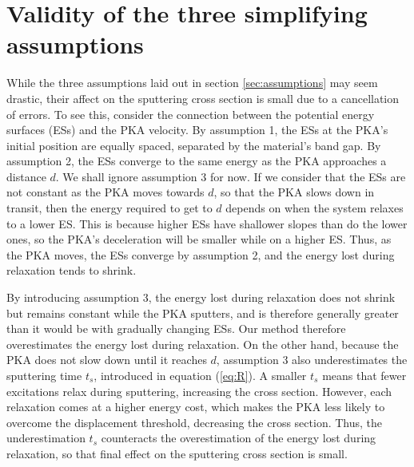 \documentclass{article}
\begin{document}
\pagebreak
\section{Validity of the three simplifying assumptions}
\label{app:assumptions}

While the three assumptions laid out in section \ref{sec:assumptions} may seem
drastic, their affect on the sputtering cross section is small due to a
cancellation of errors.
To see this, consider the connection between the potential energy
surfaces (ESs) and the PKA velocity.
By assumption 1, the ESs at the PKA’s initial position are equally spaced,
separated by the material's band gap.
By assumption 2, the ESs converge to the same energy as the PKA
approaches a distance $d$.
We shall ignore assumption 3 for now.
If we consider that the ESs are not constant as the PKA moves towards $d$, so
that the PKA slows down in transit, then the energy required to get to $d$
depends on when the system relaxes to a lower ES.
This is because higher ESs have shallower slopes than do the lower ones, so
the PKA's deceleration will be smaller while on a higher ES.
Thus, as the PKA moves, the ESs converge by assumption 2, and the energy lost
during relaxation tends to shrink.

By introducing assumption 3, the energy lost during relaxation does not
shrink but remains constant while the PKA sputters, and is therefore generally
greater than it would be with gradually changing ESs.
Our method therefore overestimates the energy lost during relaxation.
On the other hand, because the PKA does not slow down until it reaches $d$,
assumption 3 also underestimates the sputtering time $t_s$, introduced in
equation (\ref{eq:R}).
A smaller $t_s$ means that fewer excitations relax during sputtering,
increasing the cross section.
However, each relaxation comes at a higher energy cost, which makes the PKA
less likely to overcome the displacement threshold, decreasing the cross
section.
Thus, the underestimation $t_s$ counteracts the overestimation of the energy
lost during relaxation, so that final effect on the sputtering cross section is
small.
\end{document}
